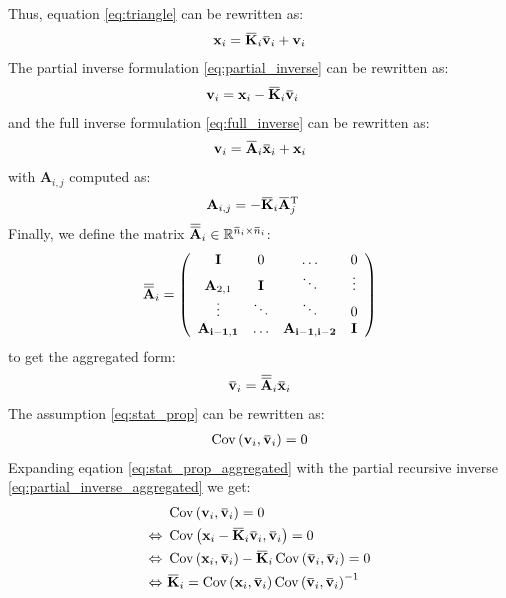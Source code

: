 \documentclass[12pt]{scrartcl}
\newcommand{\overbar}[1]{\mkern 1.5mu\overline{\mkern-1.5mu#1\mkern-1.5mu}\mkern 1.5mu}
\DeclareMathOperator{\Cov}{Cov}
\begin{document}
Thus, equation \eqref{eq:triangle} can be rewritten as:
\begin{align}
\label{eq:triangle_aggregated}
\mathbf{x}_i = \overbar{\mathbf{K}}_i \overbar{\mathbf{v}}_i + \mathbf{v}_i
\end{align}
The partial inverse formulation \eqref{eq:partial_inverse} can be rewritten as:
\begin{align}
\label{eq:partial_inverse_aggregated}
\mathbf{v}_i  & = \mathbf{x}_i - \overbar{\mathbf{K}}_i \overbar{\mathbf{v}}_i
\end{align}
and the full inverse formulation \eqref{eq:full_inverse} can be rewritten as:
\begin{align}
\label{eq:full_inverse_aggregated}
\mathbf{v}_i = \overbar{\mathbf{A}}_i \overbar{\mathbf{x}}_i + \mathbf{x}_i
\end{align}
with $\mathbf{A}_{i,j}$ computed as:
\begin{align}
\mathbf{A}_{i,j} & = - \overbar{\mathbf{K}}_i \overbar{\mathbf{A}}_j^\mathrm{T}
\end{align}
Finally, we define the matrix $\overbar{\overbar{\mathbf{A}}}_i \in \mathbb{R}^{\overbar{n}_i \times \overbar{n}_i}$:
\begin{align}
\overbar{\overbar{\mathbf{A}}}_i = \left(\begin{array}{cccc}
\mathbf{I} & 0 & \dots & 0 \\
\mathbf{A}_{2,1} & \mathbf{I} & \ddots & \vdots \\
\vdots & \ddots & \ddots & 0 \\
\mathbf{A_{i-1,1}} & \dots & \mathbf{A_{i-1,i-2}} & \mathbf{I}
\end{array}\right)
\end{align}
to get the aggregated form:
\begin{align}
\label{eq:aggregated}
\overbar{\mathbf{v}}_i = \overbar{\overbar{\mathbf{A}}}_i \overbar{\mathbf{x}}_i
\end{align}
$  $\\
The assumption \eqref{eq:stat_prop} can be rewritten as:
\begin{align}
\label{eq:stat_prop_aggregated}
\Cov\left(\mathbf{v}_i, \overbar{\mathbf{v}}_i\right) = 0
\end{align}
Expanding eqation \eqref{eq:stat_prop_aggregated} with the partial recursive inverse \eqref{eq:partial_inverse_aggregated} we get:
\begin{align}
\label{eq:partial_K_aggregated}
& \Cov\left(\mathbf{v}_i, \overbar{\mathbf{v}}_i\right) = 0 \nonumber \\
\Leftrightarrow \ & \Cov\left(\mathbf{x}_i - \overbar{\mathbf{K}}_i \overbar{\mathbf{v}}_i, \overbar{\mathbf{v}}_i\right) = 0 \nonumber \\
\Leftrightarrow \ & \Cov\left(\mathbf{x}_i, \overbar{\mathbf{v}}_i\right) - \overbar{\mathbf{K}}_i \Cov\left(\overbar{\mathbf{v}}_i, \overbar{\mathbf{v}}_i\right) = 0 \nonumber \\
\Leftrightarrow \ & \overbar{\mathbf{K}}_i = \Cov\left(\mathbf{x}_i, \overbar{\mathbf{v}}_i\right) \Cov\left(\overbar{\mathbf{v}}_i, \overbar{\mathbf{v}}_i\right)^{-1}
\end{align}
\end{document}
